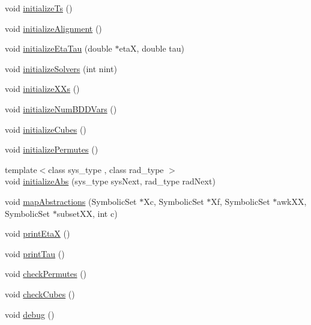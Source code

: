\begin{DoxyCompactItemize}
\item 
void \hyperlink{classscots_1_1Adaptive_aec99424e29ff42e2e7e46f747cb6ed34}{initialize\+Ts} ()
\item 
void \hyperlink{classscots_1_1Adaptive_a8f23922cbd2768a8339c73928ddc9c5a}{initialize\+Alignment} ()
\item 
void \hyperlink{classscots_1_1Adaptive_a3dca1d73761d2678f981512dee5c325d}{initialize\+Eta\+Tau} (double $\ast$etaX, double tau)
\item 
void \hyperlink{classscots_1_1Adaptive_a25cc058f39f38402ff914ae6b927393e}{initialize\+Solvers} (int nint)
\item 
void \hyperlink{classscots_1_1Adaptive_af08ee7fae4cf6c5ae1fcabb8699e0721}{initialize\+X\+Xs} ()
\item 
void \hyperlink{classscots_1_1Adaptive_ab75f4bbed30ecc70747185f36fcab200}{initialize\+Num\+B\+D\+D\+Vars} ()
\item 
void \hyperlink{classscots_1_1Adaptive_a2b4a5e42c1a4fca883c132b02295bf11}{initialize\+Cubes} ()
\item 
void \hyperlink{classscots_1_1Adaptive_a7351461977b9be0f07ec2974531af677}{initialize\+Permutes} ()
\item 
{\footnotesize template$<$class sys\+\_\+type , class rad\+\_\+type $>$ }\\void \hyperlink{classscots_1_1Adaptive_ae8e0a243c51d3596f994f2b0668892e4}{initialize\+Abs} (sys\+\_\+type sys\+Next, rad\+\_\+type rad\+Next)
\item 
void \hyperlink{classscots_1_1Adaptive_a4e6a4284b5f3ef75816aaaefaf8fe51a}{map\+Abstractions} (Symbolic\+Set $\ast$Xc, Symbolic\+Set $\ast$Xf, Symbolic\+Set $\ast$awk\+XX, Symbolic\+Set $\ast$subset\+XX, int c)
\item 
void \hyperlink{classscots_1_1Adaptive_af192d9fee4a464e21d88b2d9735c5053}{print\+EtaX} ()
\item 
void \hyperlink{classscots_1_1Adaptive_a7e3c0b5babfb943dcda7f7f5c89cbb3e}{print\+Tau} ()
\item 
void \hyperlink{classscots_1_1Adaptive_aba179a9fad6056239005127af2e95f45}{check\+Permutes} ()
\item 
void \hyperlink{classscots_1_1Adaptive_a5e8e6dc690e2c800338fd2c866af8889}{check\+Cubes} ()
\item 
void \hyperlink{classscots_1_1Adaptive_a8ea5724cde577baf708496d6bef7e548}{debug} ()
\end{DoxyCompactItemize}
